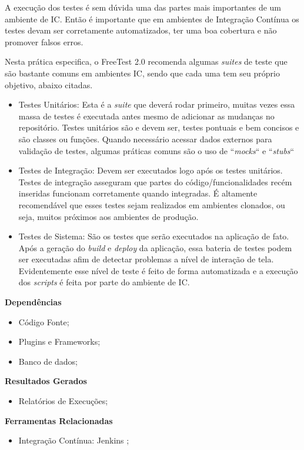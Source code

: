 A execução dos testes é sem dúvida uma das partes mais importantes de um ambiente de IC. Então é importante que em ambientes de Integração Contínua os testes devam ser corretamente automatizados, ter uma boa cobertura e não promover falsos erros.

Nesta prática especifica, o FreeTest 2.0 recomenda algumas \textit{suites} de teste que são bastante comuns em ambientes IC, sendo que cada uma tem seu próprio objetivo, abaixo citadas.

\begin{itemize}
	\item Testes Unitários: Esta é a \textit{suite} que deverá rodar primeiro, muitas vezes essa massa de testes é executada antes mesmo de adicionar as mudanças no repositório. Testes unitários são e devem ser, testes pontuais e bem concisos e são classes ou funções. Quando necessário acessar dados externos para validação de testes, algumas práticas comuns são o uso de “\textit{mocks}“ e “\textit{stubs}“
	\item Testes de Integração: Devem ser executados logo após os testes unitários. Testes de integração asseguram que partes do código/funcionalidades recém inseridas funcionam corretamente quando integradas. É altamente recomendável que esses testes sejam realizados em ambientes clonados, ou seja, muitos próximos aos ambientes de produção.
	\item Testes de Sistema: São os testes que serão executados na aplicação de fato. Após a geração do \textit{build} e \textit{deploy} da aplicação, essa bateria de testes podem ser executadas afim de detectar problemas a nível de interação de tela. Evidentemente esse nível de teste é feito de forma automatizada e a execução dos \textit{scripts} é feita por parte do ambiente de IC.
\end{itemize}

\textbf{Dependências}
\begin{itemize}
    \item Código Fonte;
    \item Plugins e Frameworks;
    \item Banco de dados;
\end{itemize}

\textbf{ Resultados Gerados}
\begin{itemize}
    \item Relatórios de Execuções;
\end{itemize}

\textbf{ Ferramentas Relacionadas}
\begin{itemize}
    \item Integração Contínua: Jenkins \cite{Jenkins};
\end{itemize}

